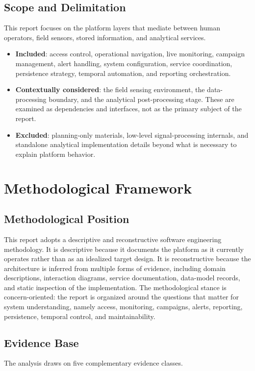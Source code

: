\documentclass[11pt,a4paper]{article}
\begin{document}
\subsection{Scope and Delimitation}
This report focuses on the platform layers that mediate between human operators, field sensors, stored information, and analytical services.

\begin{itemize}
  \item \textbf{Included}: access control, operational navigation, live monitoring, campaign management, alert handling, system configuration, service coordination, persistence strategy, temporal automation, and reporting orchestration.
  \item \textbf{Contextually considered}: the field sensing environment, the data-processing boundary, and the analytical post-processing stage. These are examined as dependencies and interfaces, not as the primary subject of the report.
  \item \textbf{Excluded}: planning-only materials, low-level signal-processing internals, and standalone analytical implementation details beyond what is necessary to explain platform behavior.
\end{itemize}

\section{Methodological Framework}

\subsection{Methodological Position}
This report adopts a descriptive and reconstructive software engineering methodology. It is descriptive because it documents the platform as it currently operates rather than as an idealized target design. It is reconstructive because the architecture is inferred from multiple forms of evidence, including domain descriptions, interaction diagrams, service documentation, data-model records, and static inspection of the implementation. The methodological stance is concern-oriented: the report is organized around the questions that matter for system understanding, namely access, monitoring, campaigns, alerts, reporting, persistence, temporal control, and maintainability.

\subsection{Evidence Base}
The analysis draws on five complementary evidence classes.
\end{document}

